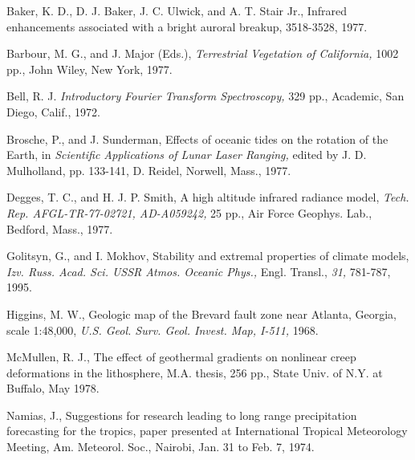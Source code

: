 \begin{article}
\begin{thebibliography}{}
Baker, K. D., D. J. Baker, J. C. Ulwick, and A. T. 
Stair Jr., Infrared enhancements associated with a 
bright auroral breakup,  
3518-3528, 1977.


Barbour, M. G., and J. Major (Eds.), {\it Terrestrial 
Vegetation of California,} 1002 pp., John Wiley, New 
York, 1977.

Bell, R. J. {\it Introductory Fourier Transform 
Spectroscopy,} 329 pp., Academic, San Diego, Calif., 
1972.

Brosche, P., and J. Sunderman, Effects of oceanic 
tides on the rotation of the Earth, in {\it Scientific 
Applications of Lunar Laser Ranging,} edited by J. D. 
Mulholland, pp. 133-141, D. Reidel, Norwell, Mass., 1977.

Degges, T. C., and H. J. P. Smith, A high altitude 
infrared radiance model, {\it Tech. Rep. AFGL-TR-77-02721, 
AD-A059242,} 25 pp., Air Force Geophys. Lab., Bedford, 
Mass., 1977.

Golitsyn, G., and I. Mokhov, Stability and extremal 
properties of climate models, {\it Izv. Russ. Acad. Sci. 
USSR Atmos. Oceanic Phys.,} Engl. Transl., {\it 31,} 
781-787, 1995.

Higgins, M. W., Geologic map of the Brevard fault 
zone near Atlanta, Georgia, scale 1:48,000, {\it U.S. 
Geol. Surv. Geol. Invest. Map, I-511,} 1968.

McMullen, R. J., The effect of geothermal gradients on 
nonlinear creep deformations in the lithosphere, M.A. 
thesis, 256 pp., State Univ. of N.Y. at Buffalo, May 1978.

Namias, J., Suggestions for research leading to long range 
precipitation forecasting for the tropics, paper presented 
at International Tropical Meteorology Meeting, Am. Meteorol.
Soc., Nairobi, Jan. 31 to Feb. 7, 1974.


\end{thebibliography}
\end{article}
